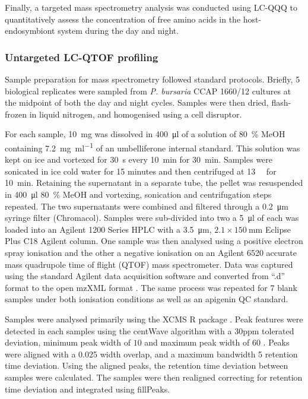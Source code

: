 Finally, a targeted mass spectrometry analysis was conducted using
LC-QQQ to quantitatively assess the concentration of free amino acids
in the host-endosymbiont system during the day and night.

\subsubsection{Untargeted LC-QTOF profiling}

Sample preparation for mass spectrometry followed standard protocols.
Briefly, 5 biological replicates were sampled from \textit{P. bursaria} CCAP 1660/12 
cultures at the midpoint of both the day and night cycles. 
Samples were then dried, flash-frozen in liquid nitrogen, and homogenised
using a cell disruptor. 

For each sample, \SI{10}{\milli\gram} was dissolved in \SI{400}{\micro\litre}
of a solution of \SI{80}{\percent} MeOH containing \SI{7.2}{\milli\gram\per\milli\litre} of
an umbelliferone internal standard.  This solution was kept on ice
and vortexed for \SI{30}{\second} every \SI{10}{\minute} for \SI{30}{\minute}.
Samples were sonicated in ice cold water for 15 minutes and then centrifuged
at \SI{13}{\kilo\rpm} for \SI{10}{\minute}.  Retaining the supernatant in a separate tube, the pellet
was resuspended in \SI{400}{\micro\litre} \SI{80}{\percent} MeOH and vortexing, sonication and centrifugation
steps repeated.  The two supernatants were combined and filtered through 
a \SI{0.2}{\micro\metre} syringe filter (Chromacol).  Samples were sub-divided into two 
a \SI{5}{\micro\litre} of each was loaded into an Agilent 1200 Series HPLC with
a \SI{3.5}{\micro\metre}, \(2.1 \times \SI{150}{\milli\metre}\) Eclipse Plus C18 Agilent column.
One sample was then analysed using a positive electron spray ionisation
and the other a negative ionisation on an Agilent 6520 accurate mass
quadrupole time of flight (QTOF) mass spectrometer. Data was captured
using the standard Agilent data acquisition software and converted
from ``.d'' format to the open mzXML format \citep{Pedrioli2004}.
The same process was repeated for 7 blank samples under both ionisation conditions
as well as an apigenin QC standard.

Samples were analysed primarily using the XCMS R package \citep{Smith2006,Tautenhahn2012}.
Peak features were detected in each samples using the centWave algorithm with a \(30\)ppm 
tolerated \si{\mz} deviation,
minimum peak width of \(10\) and maximum peak width of \(60\) \citep{Tautenhahn2008}. 
Peaks were aligned with a \SI{0.025}{\mz} width overlap, and a maximum bandwidth 5 retention time
deviation. Using the aligned peaks, the retention time deviation between samples were
calculated.  The samples were then realigned correcting for retention time deviation and
integrated using fillPeaks. 


